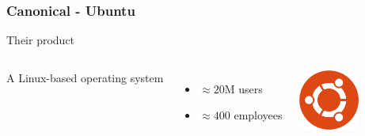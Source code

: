 \documentclass{beamer}
\begin{document}
\begin{frame}

  \frametitle{Canonical - Ubuntu}

  \begin{block}{Their product}
    \begin{columns}[c]

      A Linux-based operating system
      \begin{itemize}
        \item{$\approx 20$M users}
        \item{$\approx 400$ employees}
      \end{itemize}

      \includegraphics[width=2cm]{logo_ubuntu.png}

    \end{columns}
  \end{block}

  \vfill


\end{frame}
\end{document}
